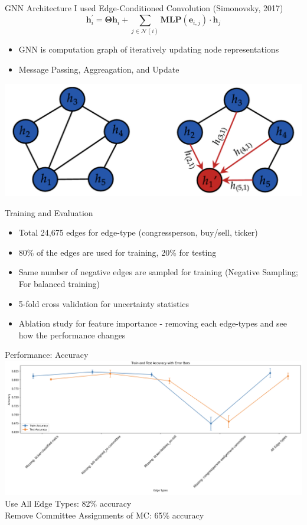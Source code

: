 \documentclass{beamer}
\begin{document}
	\begin{frame}{GNN Architecture}
		I used Edge-Conditioned Convolution (Simonovsky, 2017)
		$$
\mathbf{h}_i^{\prime}=\mathbf{\Theta} \mathbf{h}_i+\sum_{j \in \mathcal{N}(i)} \mathbf{M L P}\left(\mathbf{e}_{i, j}\right) \cdot \mathbf{h}_j
$$
		\begin{itemize}
			\item GNN is computation graph of iteratively updating node representations
			\item Message Passing, Aggreagation, and Update
		\end{itemize}
		\centering	\includegraphics[scale=0.3]{./images/mp.png}
	\end{frame}	

	\begin{frame}{Training and Evaluation}
		\begin{itemize}
			\item Total 24,675 edges for edge-type (congressperson, buy/sell, ticker)
			\item 80\% of the edges are used for training, 20\% for testing
			\item Same number of negative edges are sampled for training (Negative Sampling; For balanced training)
			\item 5-fold cross validation for uncertainty statistics
			\item Ablation study for feature importance - removing each edge-types and see how the performance changes
		\end{itemize}
	\end{frame}

	\begin{frame}{Performance: Accuracy}
		\centering	\includegraphics[scale=0.22]{./images/acc2.png}\\
		Use All Edge Types: 82\% accuracy \\
		Remove Committee Assignments of MC: 65\% accuracy
	\end{frame}
\end{document}
